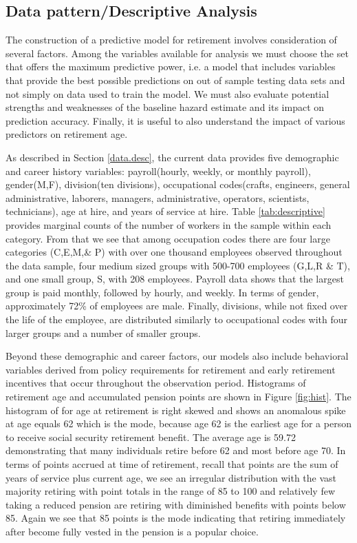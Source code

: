 \documentclass[12pt,letterpaper]{article}
\begin{document}
\subsection{Data pattern/Descriptive Analysis}

The construction of a predictive model for retirement involves consideration of several factors. Among the variables available for analysis we must choose the set that offers the maximum predictive power, i.e. a model that includes variables that provide the best possible predictions on out of sample testing data sets and not simply on data used to train the model.  We must also evaluate potential strengths and weaknesses of the baseline hazard estimate and its impact on prediction accuracy.  Finally, it is useful to also understand the impact of various predictors on retirement age.

As described in Section \ref{data.desc}, the current data provides five demographic and career history variables: payroll(hourly, weekly, or monthly payroll), gender(M,F), division(ten divisions), occupational codes(crafts, engineers, general administrative, laborers, managers, administrative, operators, scientists, technicians), age at hire, and years of service at hire. Table \ref{tab:descriptive} provides marginal counts of the number of workers in the sample within each category.  From that we see that among occupation codes there are four large categories (C,E,M,\& P)  with over one thousand employees observed throughout the data sample, four medium sized groups with 500-700 employees (G,L,R \& T), and one small group, S, with 208 employees.  Payroll data shows that the largest group is paid monthly, followed by hourly, and weekly.  In terms of gender, approximately 72\% of employees are male. Finally, divisions, while not fixed over the life of the employee, are distributed similarly to occupational codes with four larger groups and a number of smaller groups.

Beyond these demographic and career factors, our models also include behavioral variables derived from policy requirements for retirement and early retirement incentives that occur throughout the observation period. Histograms of retirement age and accumulated pension points are shown in Figure \ref{fig:hist}. The histogram of for age at retirement is right skewed and shows an anomalous spike at age equals 62 which is the mode, because age 62 is the earliest age for a person to receive social security retirement benefit.
The average age is 59.72 demonstrating that many individuals retire before 62 and most before age 70. In terms of points accrued at time of retirement, recall that points are the sum of years of service plus current age, we see an irregular distribution with the vast majority retiring with point totals in the range of 85 to 100 and relatively few taking a reduced pension are retiring with diminished benefits with points below 85. Again we see that 85 points is the mode indicating that retiring immediately after become fully vested in the pension is a popular choice.
\end{document}
